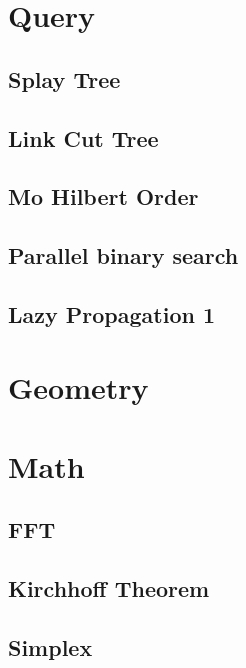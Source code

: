 \documentclass[10pt,landscape,a4paper,twocolumn]{article}
\begin{document}
%
\section{Query}

\subsection{Splay Tree}


\subsection{Link Cut Tree}


\subsection{Mo Hilbert Order}


\subsection{Parallel binary search}


\subsection{Lazy Propagation 1}


\section{Geometry}

\section{Math}
\subsection{FFT}


\subsection{Kirchhoff Theorem}


\subsection{Simplex}

\end{document}
